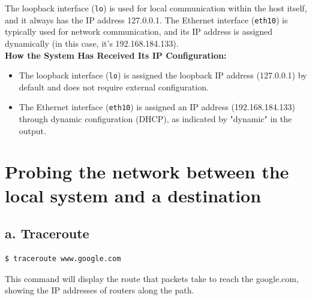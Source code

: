 \documentclass{report}
\begin{document}
The loopback interface (\texttt{lo}) is used for local communication within the host itself, and it always has the IP address 127.0.0.1.
The Ethernet interface (\texttt{eth10}) is typically used for network communication, and its IP address is assigned dynamically (in this case, it's 192.168.184.133).\cite{5} \\



\textbf{How the System Has Received Its IP Configuration:}
\begin{itemize}
  \item The loopback interface (\texttt{lo}) is assigned the loopback IP address (127.0.0.1) by default and does not require external configuration.
  \item The Ethernet interface (\texttt{eth10}) is assigned an IP address (192.168.184.133) through dynamic configuration (DHCP), as indicated by "dynamic" in the output. 
\end{itemize}


\section*{Probing the network between the local system and a destination}

\subsection*{a. Traceroute}

\begin{lstlisting}[language=bash]
  $ traceroute www.google.com
\end{lstlisting}

This command will display the route that packets take to reach the google.com, showing the IP addresses of routers along the path.
\end{document}
